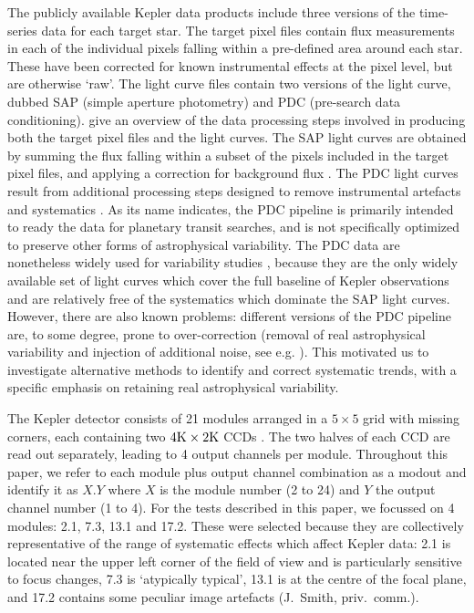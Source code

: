 \documentclass[useAMS,usenatbib]{mn2e}
\begin{document}
The publicly available Kepler data products
\citep{KeplerArchiveManual} include three versions of the time-series
data for each target star. The target pixel files contain flux
measurements in each of the individual pixels falling within a
pre-defined area around each star. These have been corrected for known
instrumental effects at the pixel level, but are otherwise `raw'. The
light curve files contain two versions of the light curve, dubbed SAP
(simple aperture photometry) and PDC (pre-search data
conditioning). \citet{jen+10,KeplerDataProcHandbook} give an overview
of the data processing steps involved in producing both the target
pixel files and the light curves. The SAP light curves are obtained by
summing the flux falling within a subset of the pixels included in the
target pixel files, and applying a correction for background flux
\citep{twi+10a}. The PDC light curves result from additional
processing steps designed to remove instrumental artefacts and
systematics \citep{stu+12a,smi+12}.  As its name indicates, the PDC
pipeline is primarily intended to ready the data for planetary transit
searches, and is not specifically optimized to preserve other forms of
astrophysical variability.  The PDC data are nonetheless widely used
for variability studies \citep[for example stellar rotation studies,
see e.g.][]{rei+13,nie+13,mcq+13a,mcq+13b,mcq+14}, because they are
the only widely available set of light curves which cover the full
baseline of Kepler observations and are relatively free of the
systematics which dominate the SAP light curves. However, there are
also known problems: different versions of the PDC pipeline are, to
some degree, prone to over-correction (removal of real astrophysical
variability and injection of additional noise, see
e.g. \citealt{rob+13}). This motivated us to investigate alternative
methods to identify and correct systematic trends, with a specific
emphasis on retaining real astrophysical variability.

The Kepler detector consists of 21 modules arranged in a $5 \times 5$
grid with missing corners, each containing two
$4{\rm K}\times 2 {\rm K}$ CCDs \citep{KeplerInstHandbook}. The two
halves of each CCD are read out separately, leading to 4 output
channels per module. Throughout this paper, we refer to each module
plus output channel combination as a modout and identify it as $X.Y$
where $X$ is the module number (2 to 24) and $Y$ the output channel number (1 to
4). For the tests described in this paper, we focussed on 4 modules: 2.1, 7.3,
13.1 and 17.2. These were selected because they are collectively
representative of the range of systematic effects which affect Kepler
data: 2.1 is located near the upper left corner of the field of view
and is particularly sensitive to focus changes, 7.3 is `atypically
typical', 13.1 is at the centre of the focal plane, and 17.2 contains
some peculiar image artefacts (J.\ Smith, priv.\ comm.). 
\end{document}
